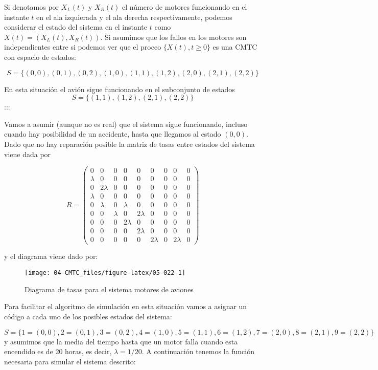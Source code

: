 \documentclass[
]{book}
\theoremstyle{definition}
\theoremstyle{definition}
\theoremstyle{definition}
\theoremstyle{definition}
\theoremstyle{remark}
\begin{document}
Si denotamos por \(X_L(t)\) y \(X_R(t)\) el número de motores funcionando en el instante \(t\) en el ala izquierada y el ala derecha respectivamente, podemos considerar el estado del sistema en el instante \(t\) como \(X(t) = (X_L(t), X_R(t))\). Si asumimos que los fallos en los motores son independientes entre si podemos ver que el proceo \(\{X(t), t \geq 0\}\) es una CMTC con espacio de estados:

\[S = \{ (0, 0), (0, 1), (0, 2), (1, 0), (1, 1), (1, 2), (2, 0), (2, 1), (2,2) \}\]

En esta situación el avión sigue funcionando en el subconjunto de estados \[S = \{ (1, 1), (1, 2), (2, 1), (2,2) \}\] :::

Vamos a asumir (aunque no es real) que el sistema sigue funcionando, incluso cuando hay posibilidad de un accidente, hasta que llegamos al estado \((0, 0)\). Dado que no hay reparación posible la matriz de tasas entre estados del sistema viene dada por

\[R = 
\begin{pmatrix}
0 & 0 & 0 & 0 & 0 & 0 & 0 & 0 & 0 \\
\lambda & 0 & 0 & 0 & 0 & 0 & 0 & 0 & 0 \\
0 & 2\lambda & 0 & 0 & 0 & 0 & 0 & 0 & 0 \\
\lambda & 0 & 0 & 0 & 0 & 0 & 0 & 0 & 0 \\
0 & \lambda & 0 & \lambda & 0 & 0 & 0 & 0 & 0 \\
0 & 0 & \lambda & 0 & 2\lambda & 0 & 0 & 0 & 0 \\
0 & 0 & 0 & 2\lambda & 0 & 0 & 0 & 0 & 0 \\
0 & 0 & 0 & 0 & 2\lambda & 0 & 0 & 0 & 0 \\
0 & 0 & 0 & 0 & 0 & 2\lambda & 0 & 2\lambda & 0
\end{pmatrix} \]

y el diagrama viene dado por:

\begin{figure}

{\centering \texttt{[image: 04-CMTC\_files/figure-latex/05-022-1]} 

}

\caption{Diagrama de tasas para el sistema motores de aviones}\label{fig:05-022}
\end{figure}

Para facilitar el algoritmo de simulación en esta situación vamos a asignar un código a cada uno de los posibles estados del sistema:

\[S = \{ 1 = (0, 0), 2 = (0, 1), 3 = (0, 2), 4 = (1, 0), 5 = (1, 1), 6 = (1, 2), 7 = (2, 0), 8 = (2, 1), 9 = (2,2) \}\] y asumimos que la media del tiempo hasta que un motor falla cuando esta encendido es de 20 horas, es decir, \(\lambda = 1/20\). A continuación tenemos la función necesaria para simular el sistema descrito:
\end{document}
